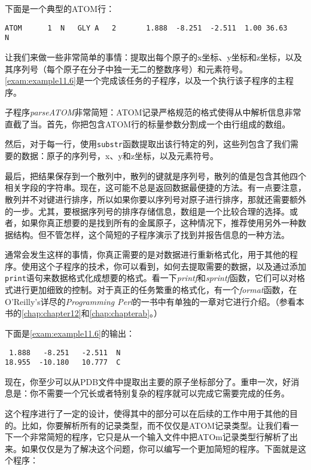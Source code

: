 下面是一个典型的ATOM行：

\begin{lstlisting}
ATOM      1  N   GLY A   2       1.888  -8.251  -2.511  1.00 36.63           N  
\end{lstlisting}

让我们来做一些非常简单的事情：提取出每个原子的x坐标、y坐标和z坐标，以及其序列号（每个原子在分子中独一无二的整数序号）和元素符号。\autoref{exam:example11.6}是一个完成该任务的子程序，以及一个执行该子程序的主程序。



子程序\textit{parseATOM}非常简短：ATOM记录严格规范的格式使得从中解析信息非常直截了当。首先，你把包含ATOM行的标量参数分割成一个由行组成的数组。

然后，对于每一行，使用\verb|substr|函数提取出该行特定的列，这些列包含了我们需要的数据：原子的序列号，x、y和z坐标，以及元素符号。

最后，把结果保存到一个散列中，散列的键就是序列号，散列的值是包含其他四个相关字段的字符串。现在，这可能不总是返回数据最便捷的方法。有一点要注意，散列并不对键进行排序，所以如果你要以序列号对原子进行排序，那就还需要额外的一步。尤其，要根据序列号的排序存储信息，数组是一个比较合理的选择。或者，如果你真正想要的是找到所有的金属原子，这种情况下，推荐使用另外一种数据结构。但不管怎样，这个简短的子程序演示了找到并报告信息的一种方法。

通常会发生这样的事情，你真正需要的是对数据进行重新格式化，用于其他的程序。使用这个子程序的技术，你可以看到，如何去提取需要的数据，以及通过添加\verb|print|语句来数据格式化成想要的格式。看一下\textit{printf}和\textit{sprintf}函数，它们可以对格式进行更加细致的控制。对于真正的任务繁重的格式化，有一个\textit{format}函数，在O'Reilly's详尽的\textit{Programming Perl}的一书中有单独的一章对它进行介绍。（参看本书的\autoref{chap:chapter12}和\autoref{chap:chapterab}。）

下面是\autoref{exam:example11.6}的输出：

\begin{lstlisting}
 1.888   -8.251   -2.511  N
18.955  -10.180   10.777  C
\end{lstlisting}

现在，你至少可以从PDB文件中提取出主要的原子坐标部分了。重申一次，好消息是：你不需要一个冗长或者特别复杂的程序就可以完成它需要完成的任务。

这个程序进行了一定的设计，使得其中的部分可以在后续的工作中用于其他的目的。比如，你要解析所有的记录类型，而不仅仅是ATOM记录类型。让我们看一下一个非常简短的程序，它只是从一个输入文件中把ATOm记录类型行解析了出来。如果仅仅是为了解决这个问题，你可以编写一个更加简短的程序。下面就是这个程序：

